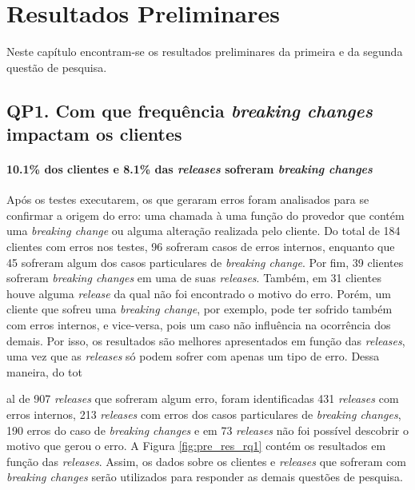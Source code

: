 \chapter{Resultados Preliminares}
\label{cap:res_pre}

Neste capítulo encontram-se os resultados preliminares da primeira e da segunda questão de pesquisa.

\section{QP1. Com que frequência \textit{breaking changes} impactam os clientes}
\label{res:qp1}

\subsubsection{\textbf{10.1\% dos clientes e 8.1\% das \textit{releases} sofreram \textit{breaking changes}}}

Após os testes executarem, os que geraram erros foram analisados para se confirmar a origem do erro: uma chamada à uma função do provedor que contém uma \textit{breaking change} ou alguma alteração realizada pelo cliente. Do total de 184 clientes com erros nos testes, 96 sofreram casos de erros internos, enquanto que 45 sofreram algum dos casos particulares de \textit{breaking change}. Por fim, 39 clientes sofreram \textit{breaking changes} em uma de suas \textit{releases}. Também, em 31 clientes houve alguma \textit{release} da qual não foi encontrado o motivo do erro. Porém, um cliente que sofreu uma \textit{breaking change}, por exemplo, pode ter sofrido também com erros internos, e vice-versa, pois um caso não influência na ocorrência dos demais. Por isso, os resultados são melhores apresentados em função das \textit{releases}, uma vez que as \textit{releases} só podem sofrer com apenas um tipo de erro. Dessa maneira, do tot


al de 907 \textit{releases} que sofreram algum erro, foram identificadas 431 \textit{releases} com erros internos, 213 \textit{releases} com erros dos casos particulares de \textit{breaking changes}, 190 erros do caso de \textit{breaking changes} e em 73 \textit{releases} não foi possível descobrir o motivo que gerou o erro. A Figura \ref{fig:pre_res_rq1} contém os resultados em função das \textit{releases}. Assim, os dados sobre os clientes e \textit{releases} que sofreram com \textit{breaking changes} serão utilizados para responder as demais questões de pesquisa.

